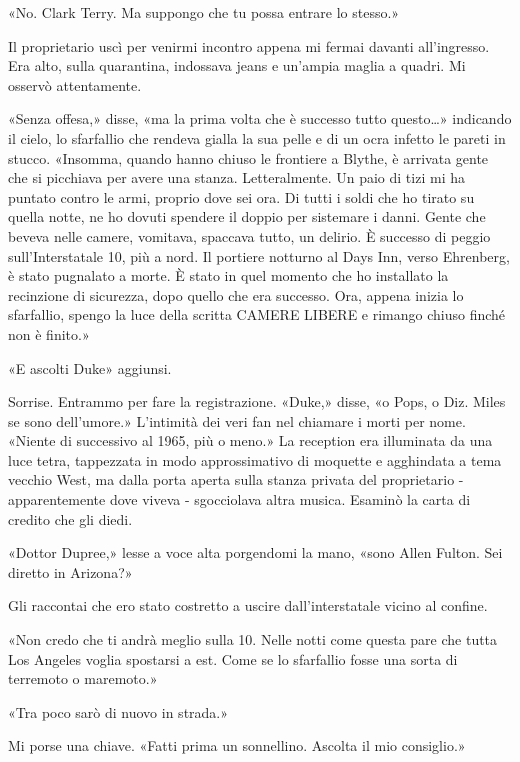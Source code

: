 «No. Clark Terry. Ma suppongo che tu possa entrare lo stesso.»

\separatorefiori

Il proprietario uscì per venirmi incontro appena mi fermai davanti
all'ingresso. Era alto, sulla quarantina, indossava jeans e un'ampia
maglia a quadri. Mi osservò attentamente.

«Senza offesa,» disse, «ma la prima volta che è successo tutto
questo\ldots» indicando il cielo, lo sfarfallio che rendeva gialla la
sua pelle e di un ocra infetto le pareti in stucco. «Insomma, quando
hanno chiuso le frontiere a Blythe, è arrivata gente che si picchiava
per avere una stanza. Letteralmente. Un paio di tizi mi ha puntato
contro le armi, proprio dove sei ora. Di tutti i soldi che ho tirato su
quella notte, ne ho dovuti spendere il doppio per sistemare i danni.
Gente che beveva nelle camere, vomitava, spaccava tutto, un delirio. È
successo di peggio sull'Interstatale 10, più a nord. Il portiere
notturno al Days Inn, verso Ehrenberg, è stato pugnalato a morte. È
stato in quel momento che ho installato la recinzione di sicurezza, dopo
quello che era successo. Ora, appena inizia lo sfarfallio, spengo la
luce della scritta {CAMERE LIBERE} e rimango chiuso finché non è
finito.»

«E ascolti Duke» aggiunsi.

Sorrise. Entrammo per fare la registrazione. «Duke,» disse, «o Pops, o
Diz. Miles se sono dell'umore.» L'intimità dei veri fan nel chiamare i
morti per nome. «Niente di successivo al 1965, più o meno.» La reception
era illuminata da una luce tetra, tappezzata in modo approssimativo di
moquette e agghindata a tema vecchio West, ma dalla porta aperta sulla
stanza privata del proprietario - apparentemente dove viveva -
sgocciolava altra musica. Esaminò la carta di credito che gli diedi.

«Dottor Dupree,» lesse a voce alta porgendomi la mano, «sono Allen
Fulton. Sei diretto in Arizona?»

Gli raccontai che ero stato costretto a uscire dall'interstatale vicino
al confine.

«Non credo che ti andrà meglio sulla 10. Nelle notti come questa pare
che tutta Los Angeles voglia spostarsi a est. Come se lo sfarfallio
fosse una sorta di terremoto o maremoto.»

«Tra poco sarò di nuovo in strada.»

Mi porse una chiave. «Fatti prima un sonnellino. Ascolta il mio
consiglio.»

